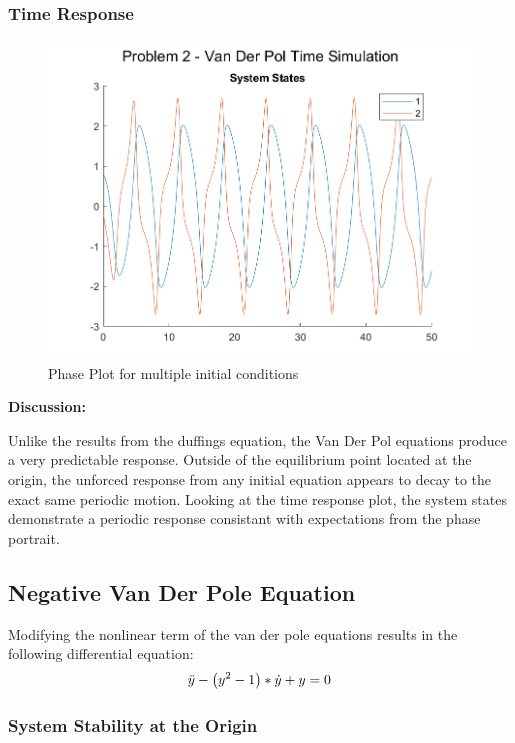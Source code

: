 \documentclass[letter]{article}
\begin{document}
\newpage
\subsubsection{Time Response}
\begin{figure}[h]
	\centering
	\includegraphics[width=0.8\linewidth]{fig/pblm2_vs_time}
	\caption{Phase Plot for multiple initial conditions}
	\label{fig:pblm2vstime}
\end{figure}


\textbf{Discussion:}

Unlike the results from the duffings equation, the Van Der Pol equations produce a very predictable response. Outside of the equilibrium point located at the origin, the unforced response from any initial equation appears to decay to the exact same periodic motion. Looking at the time response plot, the system states demonstrate a periodic response consistant with expectations from the phase portrait.



\newpage
\subsection{Negative Van Der Pole Equation}

Modifying the nonlinear term of the van der pole equations results in the following differential equation:
\begin{displaymath}
	\ddot{y} - \qty(y^2 - 1)*\dot{y} + y = 0
\end{displaymath}


\subsubsection{System Stability at the Origin}
\end{document}
